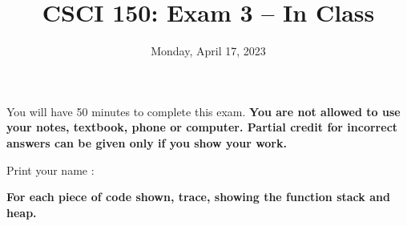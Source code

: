 \documentclass{article}
\begin{document}
\title{CSCI 150: Exam 3 -- In Class}
\author{}
\date{Monday, April 17, 2023}

\maketitle

\thispagestyle{empty}

You will have 50 minutes to complete this exam. \textbf{You are not allowed
  to use your notes, textbook, phone or computer.  Partial credit for
  incorrect answers can be given only if you show your work.}
\bigskip

  \vspace{0.3in}

Print your name : \underline{\phantom{XXXXXXXXXXXXXXXXXXXXXXXXX}}
\vspace{1in}



\newpage

\textbf{For each piece of code shown, trace, showing the function
  stack and heap.}
\end{document}
